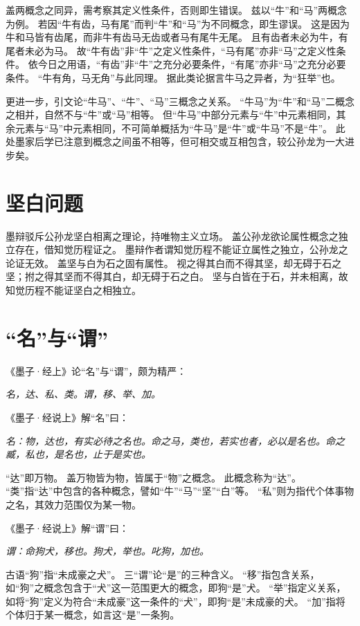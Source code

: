 \documentclass[11pt]{article}
\begin{document}
盖两概念之同异，需考察其定义性条件，否则即生错误。
兹以“牛”和“马”两概念为例。
若因“牛有齿，马有尾”而判“牛”和“马”为不同概念，即生谬误。
这是因为牛和马皆有齿尾，而非牛有齿马无齿或者马有尾牛无尾。
且有齿者未必为牛，有尾者未必为马。
故“牛有齿”非“牛”之定义性条件，“马有尾”亦非“马”之定义性条件。
依今日之用语，“有齿”非“牛”之充分必要条件，“有尾”亦非“马”之充分必要条件。
“牛有角，马无角”与此同理。
据此类论据言牛马之异者，为“狂举”也。

\newline

更进一步，引文论“牛马”、“牛”、“马”三概念之关系。
“牛马”为“牛”和“马”二概念之相并，自然不与“牛”或“马”相等。
但“牛马”中部分元素与“牛”中元素相同，其余元素与“马”中元素相同，不可简单概括为“牛马”是“牛”或“牛马”不是“牛”。
此处墨家后学已注意到概念之间虽不相等，但可相交或互相包含，较公孙龙为一大进步矣。

\section{坚白问题}
墨辩驳斥公孙龙坚白相离之理论，持唯物主义立场。
盖公孙龙欲论属性概念之独立存在，借知觉历程证之。
墨辩作者谓知觉历程不能证立属性之独立，公孙龙之论证无效。
盖坚与白为石之固有属性。
视之得其白而不得其坚，却无碍于石之坚；拊之得其坚而不得其白，却无碍于石之白。
坚与白皆在于石，并未相离，故知觉历程不能证坚白之相独立。

\section{“名”与“谓”}
《墨子·经上》论“名”与“谓”，颇为精严：

\textit{名，达、私、类。谓，移、举、加。}

\newline

《墨子·经说上》解“名”曰：

\textit{名：物，达也，有实必待之名也。命之马，类也，若实也者，必以是名也。命之臧，私也，是名也，止于是实也。}

“达”即万物。
盖万物皆为物，皆属于“物”之概念。
此概念称为“达”。
“类”指“达”中包含的各种概念，譬如“牛”“马”“坚”“白”等。
“私”则为指代个体事物之名，其效力范围仅为某一物。

\newline

《墨子·经说上》解“谓”曰：

\textit{谓：命狗犬，移也。狗犬，举也。叱狗，加也。}

古语“狗”指“未成豪之犬”。
三“谓”论“是”的三种含义。
“移”指包含关系，如“狗”之概念包含于“犬”这一范围更大的概念，即狗“是”犬。
“举”指定义关系，如将“狗”定义为符合“未成豪”这一条件的“犬”，即狗“是”未成豪的犬。
“加”指将个体归于某一概念，如言这“是”一条狗。
\end{document}
